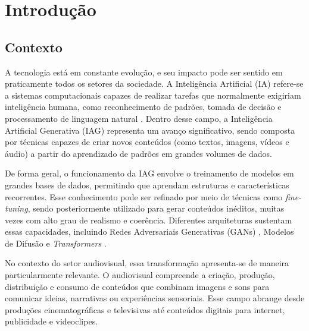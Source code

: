 

\chapter{Introdução}

\section{Contexto}

A tecnologia está em constante evolução, e seu impacto pode ser sentido em praticamente todos os setores da sociedade. A Inteligência Artificial (IA) refere-se a sistemas computacionais capazes de realizar tarefas que normalmente exigiriam inteligência humana, como reconhecimento de padrões, tomada de decisão e processamento de linguagem natural \citep{russell2016artificial}. Dentro desse campo, a Inteligência Artificial Generativa (IAG) representa um avanço significativo, sendo composta por técnicas capazes de criar novos conteúdos (como textos, imagens, vídeos e áudio) a partir do aprendizado de padrões em grandes volumes de dados.

De forma geral, o funcionamento da IAG envolve o treinamento de modelos em grandes bases de dados, permitindo que aprendam estruturas e características recorrentes. Esse conhecimento pode ser refinado por meio de técnicas como \textit{fine-tuning}, sendo posteriormente utilizado para gerar conteúdos inéditos, muitas vezes com alto grau de realismo e coerência. Diferentes arquiteturas sustentam essas capacidades, incluindo Redes Adversariais Generativas (GANs) \citep{goodfellow2014generative}, Modelos de Difusão \citep{dhariwal2021diffusion} e \textit{Transformers} \citep{vaswani2017attention}.

No contexto do setor audiovisual, essa transformação apresenta-se de maneira particularmente relevante. O audiovisual compreende a criação, produção, distribuição e consumo de conteúdos que combinam imagens e sons para comunicar ideias, narrativas ou experiências sensoriais. Esse campo abrange desde produções cinematográficas e televisivas até conteúdos digitais para internet, publicidade e videoclipes.

